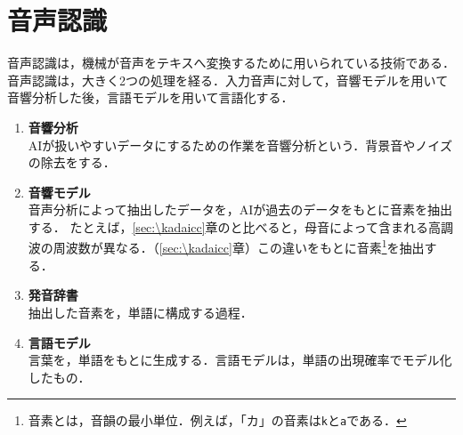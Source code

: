 \section{音声認識}
音声認識は，機械が音声をテキスへ変換するために用いられている技術である．
音声認識は，大きく2つの処理を経る．入力音声に対して，音響モデルを用いて音響分析した後，言語モデルを用いて言語化する．
\begin{enumerate}
    \item \textbf{音響分析}\\
          AIが扱いやすいデータにするための作業を音響分析という．背景音やノイズの除去をする．
    \item \textbf{音響モデル}\\
          音声分析によって抽出したデータを，AIが過去のデータをもとに音素を抽出する．
          たとえば，\ref{sec:\kadaicc}章のと比べると，母音によって含まれる高調波の周波数が異なる．（\ref{sec:\kadaicc}章）この違いをもとに音素\footnote{音素とは，音韻の最小単位．例えば，「カ」の音素は\texttt{k}と\texttt{a}である．}を抽出する．
    \item \textbf{発音辞書}\\
          抽出した音素を，単語に構成する過程．
    \item \textbf{言語モデル}\\
          言葉を，単語をもとに生成する．言語モデルは，単語の出現確率でモデル化したもの．
\end{enumerate}